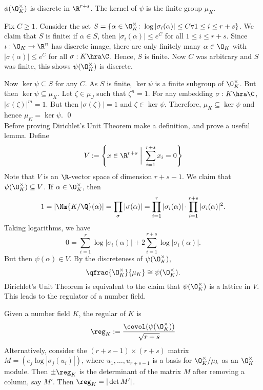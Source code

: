 \begin{prop}
$\phi(\O_K^\times)$ is discrete in $\R^{r+s}$. The kernel of $\psi$ is the finite group $\mu_K$. 
\end{prop}

\pf Fix $C \geq 1$. Consider the set $S=\{ \alpha \in \O_K^\times \colon \log|\sigma_i(\alpha)| \leq C \forall 1\leq i \leq r+s\}$. We claim that $S$ is finite: if $\alpha \in S$, then $|\sigma_i(\alpha)| \leq e^C$ for all $1 \leq i \leq r+s$. Since $\iota: \O_K \to \R^n$ has discrete image, there are only finitely many $\alpha \in \O_K$ with $|\sigma(\alpha)| \leq e^C$ for all $\sigma: K \hra \C$. Hence, $S$ is finite. Now $C$ was arbitrary and $S$ was finite, this shows $\psi(\O_K^\times)$ is discrete. 

Now $\ker \psi \subseteq S$ for any $C$. As $S$ is finite, $\ker \psi$ is a finite subgroup of $\O_K^\times$. But then $\ker \psi \subseteq \mu_K$. Let $\zeta \in \mu_J$ such that $\zeta^n=1$. For any embedding $\sigma: K \hra \C$, $|\sigma(\zeta)|^m=1$. But then $|\sigma(\zeta)|=1$ and $\zeta \in \ker \psi$. Therefore, $\mu_K \subseteq \ker \psi$ and hence $\mu_K=\ker \psi$. \qed \\


Before proving Dirichlet's Unit Theorem make a definition, and prove a useful lemma. Define
	\[
	V:= \left\{ x \in \R^{r+s} \;\bigg|\; \sum_{i=1}^{r+s} x_i =0 \right\}
	\]
Note that $V$ is an $\R$-vector space of dimension $r+s-1$. We claim that $\psi(\O_K^\times) \subseteq V$. If $\alpha \in \O_K^\times$, then 
	\[
	1= |\Nm{K/\Q}(\alpha)|= \prod_\sigma |\sigma(\alpha)| = \prod_{i=1}^r |\sigma_i(\alpha)| \cdot \prod_{i=1}^{r+s} |\sigma_i(\alpha)|^2.
	\]
Taking logarithms, we have
	\[
	0= \sum_{i=1}^r \log|\sigma_i(\alpha)| + 2 \sum_{i=1}^{r+s} \log|\sigma_i(\alpha)|.
	\]
But then $\psi(\alpha) \in V$. By the discreteness of $\psi(\O_K^\times)$,
	\[
	\qfrac{\O_K^\times}{\mu_K} \cong \psi(\O_K^\times).
	\]
Dirichlet's Unit Theorem is equivalent to the claim that $\psi(\O_K^\times)$ is a lattice in $V$. This leads to the regulator of a number field.

\begin{dfn}[Regulator]
Given a number field $K$, the regular of $K$ is
	\[
	\reg_K:= \dfrac{\covol(\psi(\O_K^\times))}{\sqrt{r+s}}
	\]
Alternatively, consider the $(r+s-1) \times (r+s)$ matrix $M=(e_j \log|\sigma_j(u_i)|)$, where $u_1,\ldots,u_{r+s-1}$ is a basis for $\O_K^\times/\mu_k$ as an $\O_K^\times$-module. Then $\pm\reg_K$ is the determinant of the matrix $M$ after removing a column, say $M'$. Then $\reg_K= |\det M'|$.
\end{dfn}

